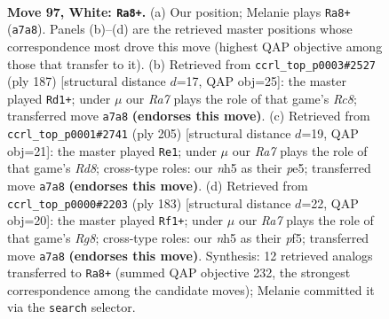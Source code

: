 \documentclass[11pt]{article}
\begin{document}
\clearpage

\begin{figure}[p]\centering
\begin{subfigure}{0.46\textwidth}\centering
\resizebox{\linewidth}{!}{%
\newchessgame
\chessboard[
  setfen={2k5/R7/8/7n/p6r/P7/7p/7K w - - 20 97},
  showmover=false,
  pgfstyle=straightmove, color=movearrow, markmove={a7-a8}
]}
\caption{}
\end{subfigure}\hfill
\begin{subfigure}{0.46\textwidth}\centering
\resizebox{\linewidth}{!}{%
\newchessgame
\chessboard[
  setfen={8/k7/P7/R1P5/3K4/8/8/2r5 b - - 28 94},
  showmover=false,
  pgfstyle=straightmove, color=movearrow, markmove={c1-d1}
]}
\caption{}
\end{subfigure}
\\[4pt]
\begin{subfigure}{0.46\textwidth}\centering
\resizebox{\linewidth}{!}{%
\newchessgame
\chessboard[
  setfen={8/6k1/4R1P1/2K1P3/8/8/8/3r4 b - - 8 103},
  showmover=false,
  pgfstyle=straightmove, color=movearrow, markmove={d1-e1}
]}
\caption{}
\end{subfigure}\hfill
\begin{subfigure}{0.46\textwidth}\centering
\resizebox{\linewidth}{!}{%
\newchessgame
\chessboard[
  setfen={8/7k/7P/5P2/8/5K1R/8/6r1 b - - 0 92},
  showmover=false,
  pgfstyle=straightmove, color=movearrow, markmove={g1-f1}
]}
\caption{}
\end{subfigure}
\caption{\textbf{Move 97, White: \texttt{Ra8+}.} (a) Our position; Melanie plays \texttt{Ra8+} (\texttt{a7a8}). Panels (b)--(d) are the retrieved master positions whose correspondence most drove this move (highest QAP objective among those that transfer to it). (b) Retrieved from \texttt{ccrl\_top\_p0003\#2527} (ply 187) [structural distance $d$=17, QAP obj=25]: the master played \texttt{Rd1+}; under $\mu$ our \emph{Ra7} plays the role of that game's \emph{Rc8}; transferred move \texttt{a7a8} \textbf{(endorses this move)}. (c) Retrieved from \texttt{ccrl\_top\_p0001\#2741} (ply 205) [structural distance $d$=19, QAP obj=21]: the master played \texttt{Re1}; under $\mu$ our \emph{Ra7} plays the role of that game's \emph{Rd8}; cross-type roles: our \emph{n}h5 as their \emph{p}e5; transferred move \texttt{a7a8} \textbf{(endorses this move)}. (d) Retrieved from \texttt{ccrl\_top\_p0000\#2203} (ply 183) [structural distance $d$=22, QAP obj=20]: the master played \texttt{Rf1+}; under $\mu$ our \emph{Ra7} plays the role of that game's \emph{Rg8}; cross-type roles: our \emph{n}h5 as their \emph{p}f5; transferred move \texttt{a7a8} \textbf{(endorses this move)}. Synthesis: 12 retrieved analogs transferred to \texttt{Ra8+} (summed QAP objective 232, the strongest correspondence among the candidate moves); Melanie committed it via the \texttt{search} selector.}
\label{fig:thought-m192}
\end{figure}
\end{document}
